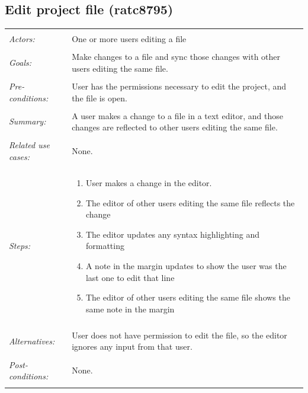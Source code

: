 \documentclass[11pt]{report}
\begin{document}
\subsection{Edit project file (ratc8795)}
\begin{tabular}{ p{2cm} p{12cm} }
 \hline
 \\
 \textit{Actors:} & One or more users editing a file \\ 
 \\
 \textit{Goals:} & Make changes to a file and sync those changes with other users editing the same file. \\
 \\
 \textit{Pre-conditions:} & User has the permissions necessary to edit the project, and the file is open.\\
 \\
 \textit{Summary:} & A user makes a change to a file in a text editor, and those changes are reflected to other users editing the same file. \\ 
 \\
 \textit{Related use cases:} & None. \\ 
 \\
 \textit{Steps:} & \begin{enumerate}
  \item User makes a change in the editor.
  \item The editor of other users editing the same file reflects the change
  \item The editor updates any syntax highlighting and formatting
  \item A note in the margin updates to show the user was the last one to edit that line
  \item The editor of other users editing the same file shows the same note in the margin
 \end{enumerate} \\
 \\
 \textit{Alternatives:} & User does not have permission to edit the file, so the editor ignores any input from that user. \\
 \\
 \textit{Post-conditions:} & None. \\
 \\
\hline
\end{tabular}
\end{document}
